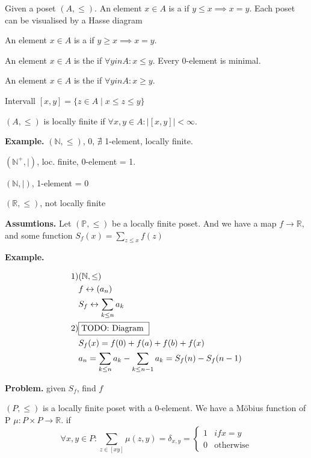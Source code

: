 \begin{definition}
Given a poset $(A, \leq)$. 
An element $x \in A$ is a  if $y \leq x \implies x=y$. 
Each poset can be visualised by a Hasse diagram


An element $x \in A$ is a  if $y \geq x \implies x=y$. 

An element $x \in A$ is the  if $\forall y in A : x \leq y$. 
Every 0-element is minimal. 

An element $x \in A$ is the  if $\forall y in A : x \geq y$.

Intervall $[x,y] = \{z \in A \mid x \leq z \leq y\}$

$(A, \leq)$ is locally finite if $\forall x,y \in A: | [x,y]| < \infty$. 
\end{definition}

\textbf{Example.}
$(\mathbb{N}, \leq)$, 0, $\nexists$ 1-element, locally finite. 

$(\mathbb{N}^{+}, \mid)$, loc. finite, 0-element = 1. 

$(\mathbb{N}, \mid)$, 1-element = 0

$(\mathbb{R}, \leq)$, not locally finite

\textbf{Assumtions.}
Let $(\mathbb{P}, \leq)$ be a locally finite poset. And we have a map $f \rightarrow \mathbb{R}$, and some function $S_f(x) = \sum_{z \leq x} f(z)$

\textbf{Example.}

\begin{align*}
  \text{1)} 
    & (\mathbb{N}, \leq) \\
    & f \leftrightarrow (a_n) \\
    & S_f \leftrightarrow \sum_{k\leq n} a_k \\
  \text{2)} & \fbox{TODO: Diagram } \\
    & S_f(x) = f(0) + f(a) + f(b) + f(x) \\
    & a_n = \sum_{k \leq n} a_k - \sum_{k \leq n-1} a_k = S_f(n) - S_f(n-1)
\end{align*}

\textbf{Problem.}
given $S_f$, find $f$

\begin{definition}
$(P, \leq)$ is a locally finite poset with a 0-element. 
We have a Möbius function of P $\mu: P\times P \rightarrow \mathbb{R}$. 
if 
\[
  \forall x,y \in P: \sum_{z\in [xy]} \mu(z,y) = \delta_{x,y} = 
    \begin{cases}
      1 & if x = y \\ 
      0 & \text{otherwise}
    \end{cases}
\]
\end{definition}

